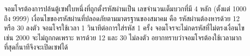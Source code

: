 ﻿%
\question จอมโจรต้องการปล้นตู้เซฟใบหนึ่งที่ถูกตั้งรหัสผ่านเป็น เลขจำนวนเต็มบวกที่มี 4 หลัก (ตั้งแต่ 1000 ถึง 9999)
เงื่อนไขของรหัสผ่านที่ปลอดภัยตามมาตรฐานของสมาคม คือ รหัสผ่านต้องหารด้วย 12 หรือ 30 ลงตัว จอมโจรใช้เวลา 1 วินาทีต่อการใส่รหัส 1 ครั้ง จอมโจรจะไม่กดรหัสที่ไม่ตรงเงื่อนไข เช่น 2000 จะไม่ถูกกดเพราะ หารด้วย 12 และ 30 ไม่ลงตัว 
อยากทราบว่าจอมโจรต้องใช้เวลามากที่สุดกี่นาทีจึงจะเปิดเซฟได้
\newline
{}
